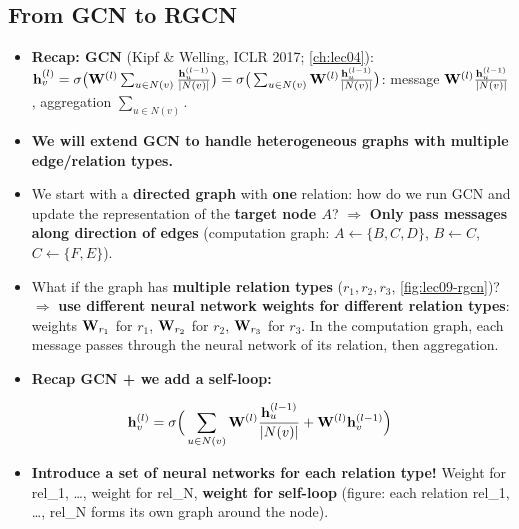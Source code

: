 \subsection{From GCN to RGCN}\label{sec:lec09-gcn2rgcn}

\begin{itemize}
  \item \textbf{Recap: GCN} (Kipf \& Welling, ICLR 2017; \cref{ch:lec04}):
    $\mathbf{h}_v^{(l)} = \sigma\big(\mathbf{W}^{(l)}\sum_{u\in N(v)}\frac{\mathbf{h}_u^{(l-1)}}{|N(v)|}\big)
    = \sigma\big(\sum_{u\in N(v)}\mathbf{W}^{(l)}\frac{\mathbf{h}_u^{(l-1)}}{|N(v)|}\big)$:
    message $\mathbf{W}^{(l)}\frac{\mathbf{h}_u^{(l-1)}}{|N(v)|}$, aggregation
    $\sum_{u\in N(v)}$.
  \item \textbf{We will extend GCN to handle heterogeneous graphs with multiple
    edge/relation types.}
  \item We start with a \textbf{directed graph} with \textbf{one} relation: how do
    we run GCN and update the representation of the \textbf{target node $A$}?
    $\Rightarrow$ \textbf{Only pass messages along direction of edges}
    (computation graph: $A\leftarrow\{B,C,D\}$, $B\leftarrow C$,
    $C\leftarrow\{F,E\}$).
  \item What if the graph has \textbf{multiple relation types} ($r_1,r_2,r_3$,
    \cref{fig:lec09-rgcn})? $\Rightarrow$ \textbf{use different neural network
    weights for different relation types}: weights $\mathbf{W}_{r_1}$ for $r_1$,
    $\mathbf{W}_{r_2}$ for $r_2$, $\mathbf{W}_{r_3}$ for $r_3$. In the computation graph, each
    message passes through the neural network of its relation, then aggregation.
  \item \textbf{Recap GCN + we add a self-loop:}
\end{itemize}
\begin{equation}\label{eq:lec09-gcn-self}
  \mathbf{h}_v^{(l)} = \sigma\Big(\sum_{u\in N(v)}\mathbf{W}^{(l)}\frac{\mathbf{h}_u^{(l-1)}}{|N(v)|}
    + \mathbf{W}^{(l)}\mathbf{h}_v^{(l-1)}\Big)
\end{equation}
\begin{itemize}
  \item \textbf{Introduce a set of neural networks for each relation type!}
    Weight for rel\_1, \dots, weight for rel\_N, \textbf{weight for self-loop}
    (figure: each relation rel\_1, \dots, rel\_N forms its own graph around the
    node).
\end{itemize}

